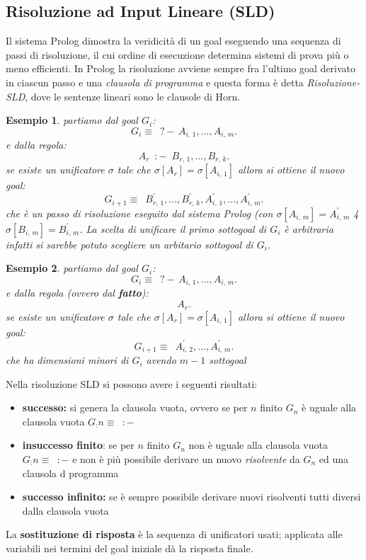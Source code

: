 \documentclass[a4paper]{report}
\newtheorem{esempio}{Esempio}
\begin{document}
\begin{itemize}
\subsection{Risoluzione ad Input Lineare (SLD)}
Il sistema Prolog dimostra la veridicità di un goal eseguendo una sequenza di passi di risoluzione, il cui ordine di esecuzione
determina sistemi di prova più o meno efficienti.\newline
In Prolog la risoluzione avviene sempre fra l’ultimo goal derivato in ciascun passo e una \emph{clausola di programma}
e questa forma è detta \emph{Risoluzione-SLD}, dove le sentenze lineari sono le clausole di Horn.
\begin{esempio}
partiamo dal goal $G_i$:
$$G_i\equiv \,\,\,?-\, A_{i,\, 1}, ...,  A_{i,\, m}.$$
e dalla regola:
$$A_r\,\,\,:-\,\,\, B_{r,\,1},..., B_{r,\,k}.$$
se esiste un unificatore $\sigma$ tale che $\sigma[A_r]=\sigma[A_{i,\,1}]$ allora si ottiene il nuovo goal:
$$G_{i+1}\equiv\,\,\,B^{'}_{r,\,1},..., B^{'}_{r,\,k},A^{'}_{i,\, 1}, ...,  A^{'}_{i,\, m}.$$
che è un passo di risoluzione eseguito dal sistema Prolog (con $\sigma[A_{i,\,m}]=A^{'}_{i,\,m}$ 4 $\sigma[B_{i,\,m}]=B^{'}_{i,\,m}$.
La scelta di unificare il primo sottogoal di $G_i$ è arbitraria infatti si sarebbe potuto scegliere un arbitario sottogoal di $G_i$.
\end{esempio}
\begin{esempio}
partiamo dal goal $G_i$:
$$G_i\equiv \,\,\,?-\, A_{i,\, 1}, ...,  A_{i,\, m}.$$
e dalla regola (ovvero dal \textbf{fatto}):
$$A_r.$$
se esiste un unificatore $\sigma$ tale che $\sigma[A_r]=\sigma[A_{i,\,1}]$ allora si ottiene il nuovo goal:
$$G_{i+1}\equiv\,\,\,A^{'}_{i,\, 2}, ...,  A^{'}_{i,\, m}.$$
che ha dimensioni minori di $G_i$ avendo $m-1$ sottogoal
\end{esempio}
Nella risoluzione SLD si possono avere i seguenti risultati:
\begin{itemize}
\item \textbf{successo:} si genera la clausola vuota, ovvero se per $n$ finito $G_n$ è uguale alla clausola vuota $G_:n\equiv\,\,\,:-$
\item \textbf{insuccesso finito}: se per $n$ finito $G_n$  non è uguale alla clausola vuota $G_:n\equiv\,\,\,:-$ e non è più possibile derivare un nuovo \textit{risolvente} da $G_n$ ed una clausola d programma
\item \textbf{successo infinito: }se è sempre possibile derivare nuovi risolventi tutti diversi dalla clausola vuota
\end{itemize}
La \textbf{sostituzione di risposta} è la sequenza di unificatori usati; applicata alle variabili nei termini del goal iniziale dà la risposta finale.\\

\end{itemize}
\end{document}
